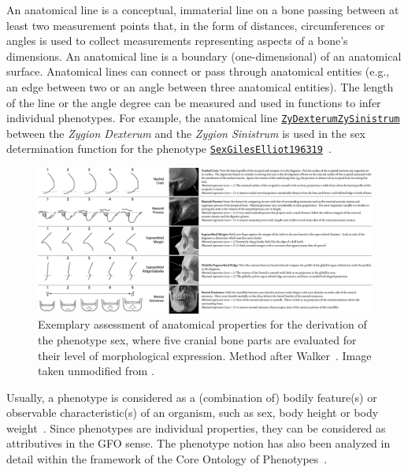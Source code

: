 \documentclass[sw]{iosart2x}
\newcommand{\anno}[1]{\href{https://annosaxfdm.de/ontology/#1}{\texttt{#1}}}
\newcommand{\latin}[1]{\emph{#1}}
\begin{document}
An anatomical line is a conceptual, immaterial line on a bone passing between at least two measurement points that, in the form of distances, circumferences or angles is used to collect measurements representing aspects of a bone's dimensions.
An anatomical line is a boundary (one-dimensional) of an anatomical surface.
Anatomical lines can connect or pass through anatomical entities (e.g., an edge between two or an angle between three anatomical entities).
The length of the line or the angle degree can be measured and used in functions to infer individual phenotypes.%
For example, the anatomical line \anno{ZyDexterumZySinistrum} between the \latin{Zygion Dexterum} and the \latin{Zygion Sinistrum} is used in the sex determination function for the phenotype \anno{SexGilesElliot196319}~\citep{sexgileselliot1963}.

\begin{figure}[h]
\includegraphics[width=\textwidth]{img/phenotype.png}
\caption{
Exemplary assessment of anatomical properties for the derivation of the phenotype sex, where five cranial bone parts are evaluated for their level of morphological expression.
Method after Walker~\cite{datacollection}.
Image taken unmodified from \cite{datacollection}.
}\label{fig:phenotype}
\end{figure}

Usually, a phenotype is considered as a (combination of) bodily feature(s) or observable characteristic(s) of an organism, such as sex, body height or body weight~\citep{ontologicaltreatment,phenomes,interoperability}.
Since phenotypes are individual properties, they can be considered as attributives in the GFO sense.
The phenotype notion has also been analyzed in detail within the framework of the Core Ontology of Phenotypes~\citep{ontologicalrepresentation}.
\end{document}
